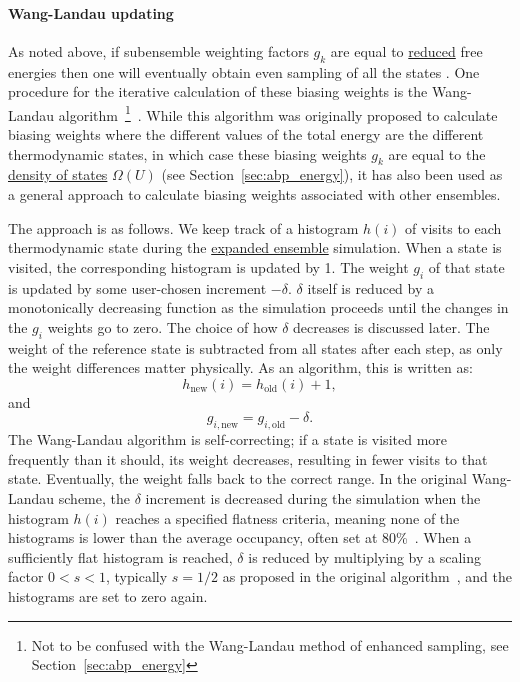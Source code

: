 \documentclass[9pt,review]{livecoms}
\begin{document}
\paragraph{Wang-Landau updating}
As noted above, if subensemble weighting factors $g_k$ are equal to \hyperlink{ref:reduced} {reduced} free energies then one will eventually obtain even sampling of all the states
\cite{lyubartsev:jcp:1992:expanded-ensembles}.  One procedure for the
iterative calculation of these biasing weights is the Wang-Landau
algorithm~\footnote{Not to be confused with the Wang-Landau method of enhanced sampling, see Section~\ref{sec:abp_energy}}~\cite{wang-landau:prl:2001:wang-landau}. While this algorithm was originally proposed to calculate biasing weights where the different values of the total energy are the different thermodynamic states, in which case these biasing weights $g_k$ are equal to the \hyperlink{ref:density_of_states} {density of states} $\Omega(U)$ (see Section~\ref{sec:abp_energy}), it has also been used as a general approach to calculate biasing weights associated with other ensembles.

The approach is as follows. We keep track of a histogram $h(i)$ of visits to each thermodynamic state during the \hyperlink{ref:ExpEns} {expanded ensemble} simulation.  When a state is visited, the corresponding
histogram is updated by 1.  The weight $g_i$ of that state is updated by some user-chosen increment $-\delta$.  $\delta$ itself is reduced by a monotonically decreasing function as the simulation proceeds until the changes in the $g_i$ weights go to zero. The choice of how $\delta$ decreases is discussed later. The
weight of the reference state is subtracted from all states after each step, as only the weight differences matter physically. As an algorithm, this is written as:
\begin{equation}
h_{\mathrm{new}}(i) = h_{\mathrm{old}}(i) + 1,
\label{eq:wang-landau_1}
\end{equation}
and 
\begin{equation}
g_{i,\mathrm{new}} = g_{i,\mathrm{old}} - \delta.
\label{eq:wang-landau_2}
\end{equation}
The Wang-Landau algorithm is self-correcting; if a state is visited more frequently than it should, its weight decreases, resulting in fewer visits to that state.  Eventually, the weight falls back to the correct range.  In the original Wang-Landau scheme, the $\delta$ increment is decreased during the simulation when the histogram $h(i)$ reaches a specified flatness criteria, meaning none of the histograms is lower than the average occupancy, often set at 80\%~\cite{wang-landau:prl:2001:wang-landau}.  When a sufficiently flat histogram is reached, $\delta$ is reduced by multiplying by a scaling factor $0<s<1$, typically $s=1/2$ as proposed in the original algorithm~\cite{wang-landau:prl:2001:wang-landau}, and the histograms are set to zero again.
\end{document}
